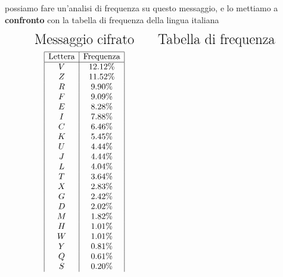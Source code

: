 \documentclass{report}
\begin{document}
possiamo fare un'analisi di frequenza su questo messaggio, e lo mettiamo a \textbf{confronto} con la tabella di frequenza della lingua italiana 

\[
\begin{array}{c@{\hskip 1cm}c} %

\text{\LARGE Messaggio cifrato} & \text{\LARGE Tabella di frequenza} \\ [0.2cm]

\begin{array}{|c|c|}
\hline
\text{Lettera} & \text{Frequenza} \\ \hline
V & 12.12\%  \\ 
 Z & 11.52\%  \\ 
 R & 9.90\%  \\ 
 F & 9.09\%  \\ 
 E & 8.28\%  \\ 
 I & 7.88\%  \\ 
 C & 6.46\%  \\ 
 K & 5.45\%  \\ 
 U & 4.44\%  \\ 
 J & 4.44\%  \\ 
 L & 4.04\%  \\ 
 T & 3.64\%  \\ 
 X & 2.83\%  \\ 
 G & 2.42\%  \\ 
 D & 2.02\%  \\ 
 M & 1.82\%  \\ 
 H & 1.01\%  \\ 
 W & 1.01\%  \\ 
 Y & 0.81\%  \\ 
 Q & 0.61\%  \\ 
 S & 0.20\%  \\ 
 

\end{array}
\end{array}\]
\end{document}
